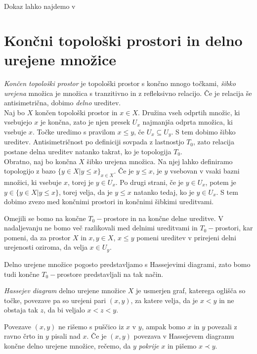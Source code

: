 \documentclass[mat1]{fmfdelo}
\begin{document}
Dokaz lahko najdemo v \cite[razdelek 3.6]{spanier}

\section{Končni topološki prostori in delno urejene množice}
\label{sec:delne}

\emph{Končen topološki prostor} je topološki prostor s končno mnogo točkami, 
\emph{šibko urejena} množica je množica s tranzitivno in z refleksivno relacijo. Če je relacija še antisimetrična, dobimo \emph{delno} ureditev.
\\ \indent Naj bo $X$ končen topološki prostor in $x \in X$. Družina vseh odprtih množic, ki vsebujejo $x$ je končna, zato je njen presek $U_x$ najmanjša odprta množica, ki vsebuje $x$.
    Točke uredimo s pravilom $ x\le y \text{, če } U_x \subseteq  U_y$. S tem dobimo šibko ureditev. 
    Antisimetričnost po definiciji sovpada z lastnostjo $T_0$, zato relacija postane delna ureditev
     natanko takrat, ko je topologija $T_0$.
    \\ \indent Obratno, naj bo končna $X$ šibko urejena množica. Na njej lahko definiramo topologijo z bazo $\{y \in X | y\le x\}_{x \in X}$. Če je
$y \le x$, je $y$ vsebovan v vsaki bazni množici, ki vsebuje $x$, torej je $y \in U_x$. Po drugi strani, če je $y\in
U_x$, potem je $y \in \{y \in X | y \le x\}$, torej velja, da je $y \le x$ natanko tedaj, ko je $y \in U_x$. S tem dobimo zvezo med končnimi prostori in končnimi šibkimi ureditvami. %

Omejili se bomo na končne $T_0-$prostore in na končne delne ureditve. V nadaljevanju ne bomo več razlikovali med delnimi ureditvami in $T_0-$prostori, kar pomeni, da za prostor $X$ in $x,y\in X$, $x\leq y$ pomeni ureditev v prirejeni delni urejenosti oziroma, da velja $x\in U_y$. 

Delno urejene množice pogosto predstavljamo s Hassejevimi diagrami, zato bomo tudi končne $T_0-$prostore predstavljali na tak način.

\begin{definicija}
    \emph{Hassejev diagram} delno urejene množice $X$ je usmerjen graf, katerega oglišča so točke, povezave pa so urejeni pari $(x,y)$, za katere velja, da je  $x<y$ in ne obstaja tak $z$, da bi veljalo $x<z<y$.
\end{definicija}

Povezave $(x,y)$ ne rišemo s puščico iz $x$ v $y$, ampak bomo $x$ in $y$ povezali z ravno črto in $y$ pisali nad $x$. Če je $(x,y)$ povezava v Hassejevem diagramu končne delno urejene množice, rečemo, da $y$ \emph{pokrije} $x$ in pišemo $x\prec y$.
\end{document}
